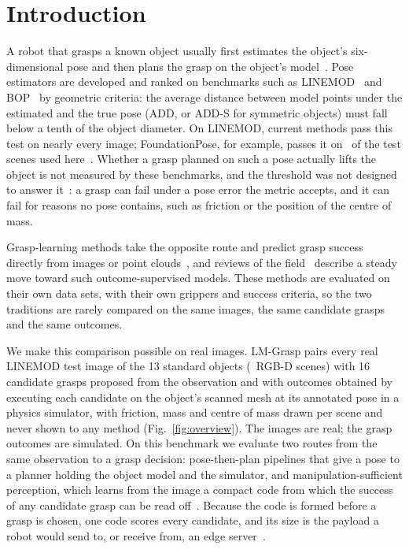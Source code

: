 \section*{Introduction}

A robot that grasps a known object usually first estimates the object's six-dimensional pose and then plans the grasp on the object's model~\cite{xiang2018posecnn,tremblay2018dope,deng2020selfsup}. Pose estimators are developed and ranked on benchmarks such as LINEMOD~\cite{hinterstoisser2012} and BOP~\cite{hodan2018bop} by geometric criteria: the average distance between model points under the estimated and the true pose (ADD, or ADD-S for symmetric objects) must fall below a tenth of the object diameter. On LINEMOD, current methods pass this test on nearly every image; FoundationPose, for example, passes it on \FpAdd\ of the test scenes used here~\cite{wen2024foundationpose}. Whether a grasp planned on such a pose actually lifts the object is not measured by these benchmarks, and the threshold was not designed to answer it~\cite{hodan2016eval}: a grasp can fail under a pose error the metric accepts, and it can fail for reasons no pose contains, such as friction or the position of the centre of mass.

Grasp-learning methods take the opposite route and predict grasp success directly from images or point clouds~\cite{mahler2017dexnet,morrison2018ggcnn,tenpas2017gpd,sundermeyer2021contact,fang2020graspnet,fang2023anygrasp}, and reviews of the field~\cite{bohg2014survey,newbury2023review} describe a steady move toward such outcome-supervised models. These methods are evaluated on their own data sets, with their own grippers and success criteria, so the two traditions are rarely compared on the same images, the same candidate grasps and the same outcomes.

We make this comparison possible on real images. LM-Grasp pairs every real LINEMOD test image of the 13 standard objects (\NScenes\ RGB-D scenes) with 16 candidate grasps proposed from the observation and with outcomes obtained by executing each candidate on the object's scanned mesh at its annotated pose in a physics simulator, with friction, mass and centre of mass drawn per scene and never shown to any method (Fig.~\ref{fig:overview}). The images are real; the grasp outcomes are simulated. On this benchmark we evaluate two routes from the same observation to a grasp decision: pose-then-plan pipelines that give a pose to a planner holding the object model and the simulator, and manipulation-sufficient perception, which learns from the image a compact code from which the success of any candidate grasp can be read off~\cite{tishby2000ib,alemi2017vib,pacelli2020}. Because the code is formed before a grasp is chosen, one code scores every candidate, and its size is the payload a robot would send to, or receive from, an edge server~\cite{kehoe2015cloud,shao2022taskcomm}.

